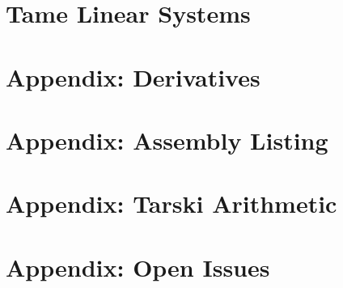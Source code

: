 \documentclass[cup9a]{cupbook}
\begin{document}
    \chapter{Tame Linear Systems}
    



    
    \label{part:appendix}
    \chapter{Appendix: Derivatives}
    \chapter{Appendix: Assembly Listing}
    
    \chapter{Appendix: Tarski Arithmetic}
     
    \chapter{Appendix: Open Issues} %
    






\backmatter

\theendnotes


\end{document}
